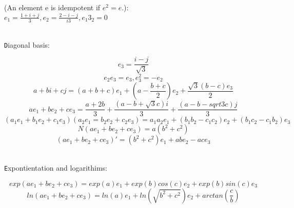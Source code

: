 \documentclass[a4paper]{article}
\begin{document}
(An element e is idempotent if $ e^{2} = e $.): \\
$ e_{1} = \frac{1+i+j}{3}, e_{2} = \frac{2-i-j}{i3},e_{1}3_{2}=0 $ \\ \\
\begin{ttfamily}
\texttt Diagonal basis:
\end{ttfamily}
\[ e_{3}=\frac{i-j}{\sqrt{3}} \]
\[ e_{2}e_{3} = e_{3}, e_{3}^{2}=-e_{2} \]
\[ a+bi+cj=(a+b+c)e_{1}+(a-\frac{b+c}{2})e_{2}+\frac{\sqrt{3}(b-c)e_{3}}{2} \]
\[ ae_{1} + be_{2} + ce_{3}=\frac{a+2b}{3}+\frac{(a-b+\sqrt{3}c)i}{3}+\frac{(a-b-sqrt{3}c)j}{3} \]
\[ (a_{1}e_{1}+b_{1}e_{2}+c_{1}e_{3})(a_{2}e_{1}=b_{2}e_{2}+c_{2}e_{3})=a_{1}a_{2}e_{1}+(b_{1}b_{2}-c_{1}c_{2})e_{2}+(b_{1}c_{2}-c_{1}b_{2})e_{3}\]
\[ N(ae_{1}+be_{2}+ce_{3})=a(b^{2}+c^{2}) \]
\[ (ae_{1}+be_{2}+ce_{3})'=(b^{2}+c^{2})e_{1}+abe_{2}-ace_{3} \] \\
\begin{ttfamily}
\texttt Expontientation and logarithims:
\end{ttfamily}
\[ exp(ae_{1}+be_{2}+ce_{3})=exp(a)e_{1}+exp(b)cos(c)e_{2}+exp(b)sin(c)e_{3} \]
\[ ln(ae_{1}+be_{2}+ce_{3})=ln(a)e_{1}+ln(\sqrt{b^{2}+c^{2}})e_{2}+arctan(\frac{c}{b}) \]
\end{document}
